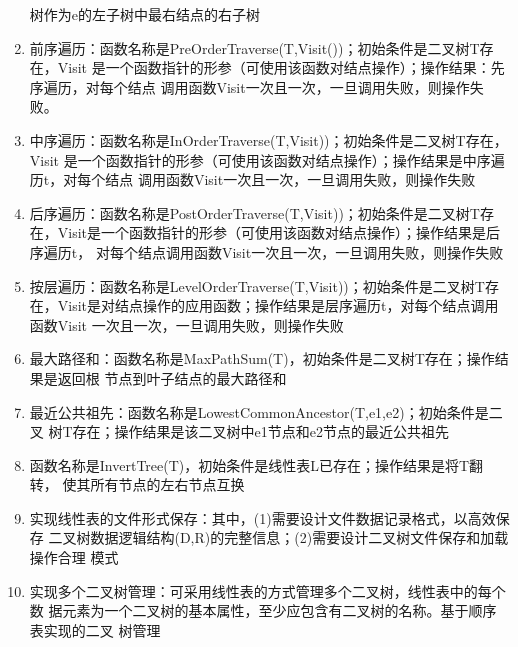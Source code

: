 \documentclass[supercite]{Experimental_Report}
\theoremstyle{definition}
\begin{document}
\begin{enumerate}
		树作为e的左子树中最右结点的右子树
		\item 
		前序遍历：函数名称是PreOrderTraverse(T,Visit())；初始条件是二叉树T存在，Visit
		是一个函数指针的形参（可使用该函数对结点操作）；操作结果：先序遍历，对每个结点
		调用函数Visit一次且一次，一旦调用失败，则操作失败。
		\item 
		中序遍历：函数名称是InOrderTraverse(T,Visit))；初始条件是二叉树T存在，Visit
		是一个函数指针的形参（可使用该函数对结点操作）；操作结果是中序遍历t，对每个结点
		调用函数Visit一次且一次，一旦调用失败，则操作失败
		\item 后序遍历：函数名称是PostOrderTraverse(T,Visit))；初始条件是二叉树T存
		在，Visit是一个函数指针的形参（可使用该函数对结点操作）；操作结果是后序遍历t，
		对每个结点调用函数Visit一次且一次，一旦调用失败，则操作失败
		\item 按层遍历：函数名称是LevelOrderTraverse(T,Visit))；初始条件是二叉树T存
		在，Visit是对结点操作的应用函数；操作结果是层序遍历t，对每个结点调用函数Visit
		一次且一次，一旦调用失败，则操作失败
		\item 
		最大路径和：函数名称是MaxPathSum(T)，初始条件是二叉树T存在；操作结果是返回根
		节点到叶子结点的最大路径和
		\item 最近公共祖先：函数名称是LowestCommonAncestor(T,e1,e2)；初始条件是二叉
		树T存在；操作结果是该二叉树中e1节点和e2节点的最近公共祖先
		\item 函数名称是InvertTree(T)，初始条件是线性表L已存在；操作结果是将T翻转，
		使其所有节点的左右节点互换
		\item 实现线性表的文件形式保存：其中，(1)需要设计文件数据记录格式，以高效保存
		二叉树数据逻辑结构(D,{R})的完整信息；(2)需要设计二叉树文件保存和加载操作合理
		模式
		\item 实现多个二叉树管理：可采用线性表的方式管理多个二叉树，线性表中的每个数
		据元素为一个二叉树的基本属性，至少应包含有二叉树的名称。基于顺序表实现的二叉
		树管理
	\end{enumerate}
\end{document}
